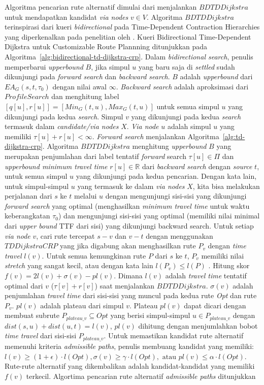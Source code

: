 Algoritma pencarian rute alternatif dimulai dari menjalankan $BDTDDijkstra$ untuk mendapatkan kandidat \textit{via nodes} $v\in V$. Algoritma $BDTDDijkstra$ terinspirasi dari kueri \textit{bidirectional} pada Time-Dependent Contraction Hierarchies yang diperkenalkan pada penelitian oleh \cite{Veit2013}. Kueri Bidirectional Time-Dependent Dijkstra untuk Customizable Route Plannning ditunjukkan pada Algoritma~\ref{alg:bidirectional-td-dijkstra-crp}. Dalam \textit{bidirectional search}, penulis memperbarui \textit{upperbound} $B$, jika simpul $u$ yang baru saja di \textit{settled} sudah dikunjungi pada \textit{forward search} dan \textit{backward search}. $B$ adalah \textit{upperbound} dari $EA_G(s,t,\tau_0)$ dengan nilai awal $\infty$. \textit{Backward search} adalah aproksimasi dari $ProfileSearch$ dan menghitung label $[q[u], r[u]]=[Min_G(t,u), Max_G(t,u)]$ untuk semua simpul $u$ yang dikunjungi pada kedua \textit{search}. Simpul $v$ yang dikunjungi pada kedua \textit{search} termasuk dalam \textit{candidate/via nodes} $X$. \textit{Via node} $u$ adalah simpul $u$ yang memiliki $\tau[u] + r[u] < \infty$. \textit{Forward search} menjalankan Algoritma~\ref{alg:td-dijkstra-crp}. Algoritma $BDTDDijkstra$ menghitung \textit{upperbound} $B$ yang merupakan penjumlahan dari label tentatif \textit{forward} search $\tau[u]\in \Pi$ dan \textit{upperbound minimum travel time} $r[u]\in \mathbb{R}$ dari \textit{backward search} dengan \textit{source} $t$, untuk semua simpul $u$ yang dikunjungi pada kedua pencarian. Dengan kata lain, untuk simpul-simpul $u$ yang termasuk ke dalam \textit{via nodes} $X$, kita bisa melakukan perjalanan dari $s$ ke $t$ melalui $u$ dengan mengunjungi sisi-sisi yang dikunjungi \textit{forward search} yang optimal (menghasilkan \textit{minimum travel time } untuk waktu keberangkatan $\tau_0$) dan mengunjungi sisi-sisi yang optimal (memiliki nilai minimal dari \textit{upper bound} TTF dari sisi) yang dikunjungi backward search. Untuk setiap \textit{via node} $v$, cari rute tercepat $s-v$ dan $v-t$ dengan menggunakan $TDDijkstraCRP$ yang jika digabung akan menghasilkan rute $P_v$ dengan \textit{time travel} $l(v)$. Untuk semua kemungkinan rute $P$  dari $s$ ke $t$, $P_v$ memiliki nilai \textit{stretch} yang sangat kecil, atau dengan kata lain $l(P_v)\leq l(P)$ \cite{Abraham2010}. Hitung skor $f(v)=2l(v)+\sigma(v)-pl(v)$. Dimana $l(v)$ adalah \textit{travel time } tentatif optimal dari $v$  ($\tau[v]+r[v]$) saat menjalankan $BDTDDijkstra$. $\sigma(v)$ adalah penjumlahan \textit{travel time} dari sisi-sisi yang muncul pada kedua rute \textit{Opt} dan rute $P_v$. $pl(v)$ adalah plateau dari simpul $v$. Plateau $pl(v)$ dapat dicari dengan membuat subrute $P_{plateau\_v}\subseteq Opt$ yang berisi simpul-simpul $u\in P_{plateau\_v}$ dengan $dist(s,u)+dist(u,t)=l(v)$, $pl(v)$ dihitung dengan menjumlahkan bobot \textit{time travel} dari sisi-sisi $P_{plateau\_v}$. Untuk memastikan kandidat rute alternatif memenuhi kriteria \textit{admissible paths}, penulis membuang kandidat yang memiliki: $l(v)\geq (1+\epsilon)\cdot l(Opt), \sigma(v)\geq\gamma \cdot l(Opt), \text{ atau } pl(v)\leq \alpha \cdot l(Opt)$. Rute-rute alternatif yang dikembalikan adalah kandidat-kandidat yang memiliki $f(v)$ terkecil. Algortima pencarian rute alternatif \textit{admissible paths} ditunjukkan 